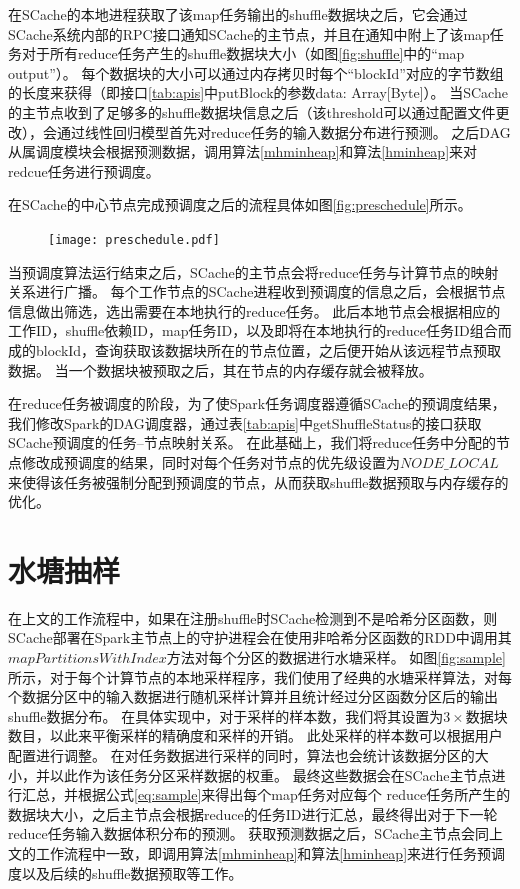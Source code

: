 在SCache的本地进程获取了该map任务输出的shuffle数据块之后，它会通过SCache系统内部的RPC接口通知SCache的主节点，并且在通知中附上了该map任务对于所有reduce任务产生的shuffle数据块大小（如图\ref{fig:shuffle}中的“map output”）。
每个数据块的大小可以通过内存拷贝时每个“blockId”对应的字节数组的长度来获得（即接口\ref{tab:apis}中putBlock的参数data: Array[Byte]）。
当SCache的主节点收到了足够多的shuffle数据块信息之后（该threshold可以通过配置文件更改），会通过线性回归模型首先对reduce任务的输入数据分布进行预测。
之后DAG从属调度模块会根据预测数据，调用算法\ref{mhminheap}和算法\ref{hminheap}来对redcue任务进行预调度。

在SCache的中心节点完成预调度之后的流程具体如图\ref{fig:preschedule}所示。

\begin{figure}[!htp]
	\centering
	\texttt{[image: preschedule.pdf]}
\end{figure}

当预调度算法运行结束之后，SCache的主节点会将reduce任务与计算节点的映射关系进行广播。
每个工作节点的SCache进程收到预调度的信息之后，会根据节点信息做出筛选，选出需要在本地执行的reduce任务。
此后本地节点会根据相应的工作ID，shuffle依赖ID，map任务ID，以及即将在本地执行的reduce任务ID组合而成的blockId，查询获取该数据块所在的节点位置，之后便开始从该远程节点预取数据。
当一个数据块被预取之后，其在节点的内存缓存就会被释放。

在reduce任务被调度的阶段，为了使Spark任务调度器遵循SCache的预调度结果，我们修改Spark的DAG调度器，通过表\ref{tab:apis}中getShuffleStatus的接口获取SCache预调度的任务--节点映射关系。
在此基础上，我们将reduce任务中分配的节点修改成预调度的结果，同时对每个任务对节点的优先级设置为$NODE\_LOCAL$\cite{sparksource}来使得该任务被强制分配到预调度的节点，从而获取shuffle数据预取与内存缓存的优化。

\section{水塘抽样}
\label{sec:sampling}

在上文的工作流程中，如果在注册shuffle时SCache检测到不是哈希分区函数，则SCache部署在Spark主节点上的守护进程会在使用非哈希分区函数的RDD中调用其$mapPartitionsWithIndex$\cite{sparksource}方法对每个分区的数据进行水塘采样。
如图\ref{fig:sample}所示，对于每个计算节点的本地采样程序，我们使用了经典的水塘采样算法\cite{reservoir}，对每个数据分区中的输入数据进行随机采样计算并且统计经过分区函数分区后的输出shuffle数据分布。
在具体实现中，对于采样的样本数，我们将其设置为$3 \times $数据块数目，以此来平衡采样的精确度和采样的开销。
此处采样的样本数可以根据用户配置进行调整。
在对任务数据进行采样的同时，算法也会统计该数据分区的大小，并以此作为该任务分区采样数据的权重。
最终这些数据会在SCache主节点进行汇总，并根据公式\ref{eq:sample}来得出每个map任务对应每个
reduce任务所产生的数据块大小，之后主节点会根据reduce的任务ID进行汇总，最终得出对于下一轮reduce任务输入数据体积分布的预测。
获取预测数据之后，SCache主节点会同上文的工作流程中一致，即调用算法\ref{mhminheap}和算法\ref{hminheap}来进行任务预调度以及后续的shuffle数据预取等工作。


